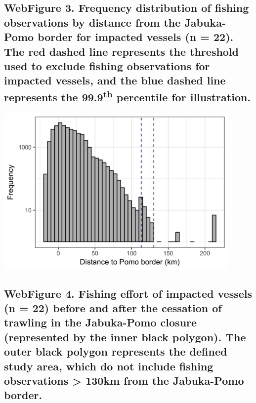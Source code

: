 \documentclass[11pt,]{article}
\begin{document}
\newpage

\subsection{\texorpdfstring{WebFigure 3. Frequency distribution of
fishing observations by distance from the Jabuka-Pomo border for
impacted vessels (n = 22). The red dashed line represents the threshold
used to exclude fishing observations for impacted vessels, and the blue
dashed line represents the 99.9\textsuperscript{th} percentile for
illustration.}{WebFigure 3. Frequency distribution of fishing observations by distance from the Jabuka-Pomo border for impacted vessels (n = 22). The red dashed line represents the threshold used to exclude fishing observations for impacted vessels, and the blue dashed line represents the 99.9th percentile for illustration.}}\label{webfigure-3.-frequency-distribution-of-fishing-observations-by-distance-from-the-jabuka-pomo-border-for-impacted-vessels-n-22.-the-red-dashed-line-represents-the-threshold-used-to-exclude-fishing-observations-for-impacted-vessels-and-the-blue-dashed-line-represents-the-99.9th-percentile-for-illustration.}

\includegraphics[width=0.90000\textwidth]{../workspace/process_effort_figs/impacted_ves_dist_pomo_histo.png}

\newpage

\subsection{WebFigure 4. Fishing effort of impacted vessels (n = 22)
before and after the cessation of trawling in the Jabuka-Pomo closure
(represented by the inner black polygon). The outer black polygon
represents the defined study area, which do not include fishing
observations \textgreater{} 130km from the Jabuka-Pomo
border.}\label{webfigure-4.-fishing-effort-of-impacted-vessels-n-22-before-and-after-the-cessation-of-trawling-in-the-jabuka-pomo-closure-represented-by-the-inner-black-polygon.-the-outer-black-polygon-represents-the-defined-study-area-which-do-not-include-fishing-observations-130km-from-the-jabuka-pomo-border.}
\end{document}
